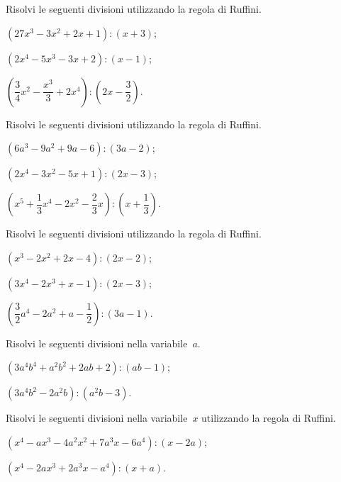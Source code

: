 \begin{esercizio}
\label{ese:12.12}
Risolvi le seguenti divisioni utilizzando la regola di Ruffini.
 \begin{enumeratea}
 \item $\left(27x^{3}-3x^{2}+2x+1\right):(x+3)$;
 \item $\left(2x^{4}-5x^{3}-3x+2\right):(x-1)$;
 \item $\left(\dfrac{3}{4}x^{2}-\dfrac{x^{3}}{3}+2x^{4}\right):\left(2x-\dfrac{3}{2}\right)$.
 \end{enumeratea}
\end{esercizio}


\begin{esercizio}
\label{ese:12.13}
Risolvi le seguenti divisioni utilizzando la regola di Ruffini.
 \begin{enumeratea}
 \item $\left(6a^{3}-9a^{2}+9a-6\right):(3a-2)$;
 \item $(2x^{4}-3x^{2}-5x+1):(2x-3)$;
 \item $\left(x^{5}+\dfrac{1}{3}x^{4}-2x^{2}-\dfrac{2}{3}x\right):\left(x+\dfrac{1}{3}\right)$.
 \end{enumeratea}
\end{esercizio}

\begin{esercizio}[\Ast]
\label{ese:12.14}
Risolvi le seguenti divisioni utilizzando la regola di Ruffini.
 \begin{enumeratea}
 \item $\left(x^{3}-2x^{2}+2x-4\right):(2x-2)$;
 \item $\left(3x^{4}-2x^{3}+x-1\right):(2x-3)$;
 \item $\left(\dfrac{3}{2}a^{4}-2a^{2}+a-\dfrac{1}{2}\right):(3a-1)$.
 \end{enumeratea}
\end{esercizio}

\begin{esercizio}[\Ast]
\label{ese:12.15}
Risolvi le seguenti divisioni nella variabile~$a$.
 \begin{enumeratea}
 \item $\left(3a^{4}b^{4}+a^{2}b^{2}+2ab+2\right):(ab-1)$;
 \item $\left(3a^{4}b^{2}-2a^{2}b\right):(a^{2}b-3)$.
 \end{enumeratea}
\end{esercizio}

\begin{esercizio}[\Ast]
\label{ese:12.16}
Risolvi le seguenti divisioni nella variabile~$x$ utilizzando la regola di Ruffini.
 \begin{enumeratea}
 \item $\left(x^{4}-ax^{3}-4a^{2}x^{2}+7a^{3}x-6a^{4}\right):(x-2a)$;
 \item $\left(x^{4}-2ax^{3}+2a^{3}x-a^{4}\right):(x+a)$.
 \end{enumeratea}
\end{esercizio}

